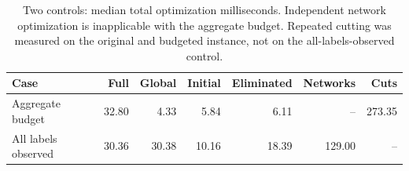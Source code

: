 \begin{table}[tb]\centering\small
\caption{Two controls: median total optimization milliseconds. Independent network optimization is inapplicable with the aggregate budget. Repeated cutting was measured on the original and budgeted instance, not on the all-labels-observed control.}
\label{tab:computation-ablations}
\setlength{\tabcolsep}{3pt}
\begin{tabular}{lrrrrrr}\toprule
Case & Full & Global & Initial & Eliminated & Networks & Cuts\\\midrule
Aggregate budget & 32.80 & 4.33 & 5.84 & 6.11 & -- & 273.35 \\
All labels observed & 30.36 & 30.38 & 10.16 & 18.39 & 129.00 & -- \\
\bottomrule\end{tabular}\end{table}

